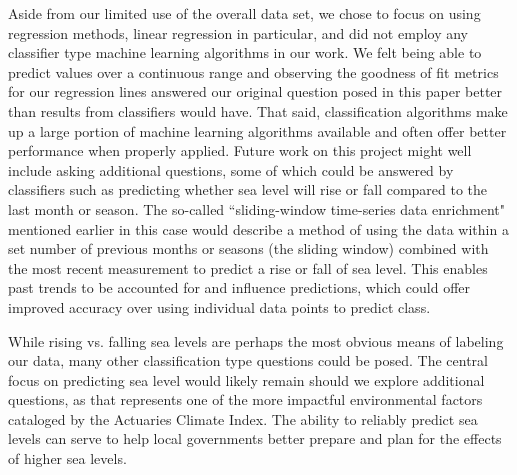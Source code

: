 \documentclass[12pt]{report}
\begin{document}
\par Aside from our limited use of the overall data set, we chose to focus on using regression methods, linear regression in particular, and did not employ any classifier type machine learning algorithms in our work. We felt being able to predict values over a continuous range and observing the goodness of fit metrics for our regression lines answered our original question posed in this paper better than results from classifiers would have. That said, classification algorithms make up a large portion of machine learning algorithms available and often offer better performance when properly applied. Future work on this project might well include asking additional questions, some of which could be answered by classifiers such as predicting whether sea level will rise or fall compared to the last month or season. The so-called \textquotedblleft sliding-window time-series data enrichment" mentioned earlier in this case would describe a method of using the data within a set number of previous months or seasons (the sliding window) combined with the most recent measurement to predict a rise or fall of sea level. This enables past trends to be accounted for and influence predictions, which could offer improved accuracy over using individual data points to predict class.
\par While rising vs. falling sea levels are perhaps the most obvious means of labeling our data, many other classification type questions could be posed. The central focus on predicting sea level would likely remain should we explore additional questions, as that represents one of the more impactful environmental factors cataloged by the Actuaries Climate Index. The ability to reliably predict sea levels can serve to help local governments better prepare and plan for the effects of higher sea levels.
\end{document}
